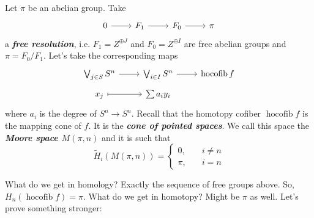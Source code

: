 \documentclass{article}
\DeclareMathOperator{\hocofib}{hocofib}
\begin{document}
\begin{defn}
	Let $\pi$ be an abelian group. Take 
	\[\begin{tikzcd}
		0\arrow[r]&F_1\arrow[r]& F_0\arrow[r]& \pi
	\end{tikzcd}\] 
	a \textbf{\textit{free resolution}}, i.e. $F_1=Z^{\oplus J}$ and $F_0=Z^{\oplus I}$ are free abelian groups and $\pi=F_0/F_1$. Let's take the corresponding maps
	\[\begin{tikzcd}[row sep=tiny]
		\bigvee_{j\in S}S^n\arrow[r]&\bigvee_{i\in I}S^n\arrow[r]&\hocofib f\\
		x_j\arrow[r,maps to]&\sum a_iy_i
	\end{tikzcd}\]
	where $a_i$ is the degree of $S^n\to S^n$.
	Recall that the homotopy cofiber $\hocofib f$ is the mapping cone of $f$. It is the \textbf{\textit{cone of pointed spaces}}. We call this space the \textbf{\textit{Moore space $M(\pi, n)$}} and it is such that
	\[\tilde{H}_i(M(\pi, n))=\begin{cases}
		0,\quad&i\neq n\\
		\pi,\quad &i=n
	\end{cases}\]
\end{defn}
	What do we get in homology? Exactly the sequence of free groups above. So, $H_n(\hocofib f)=\pi$. What do we get in homotopy? {\color{red}Might be $\pi$ as well}. Let's prove something stronger:
	
\end{document}
